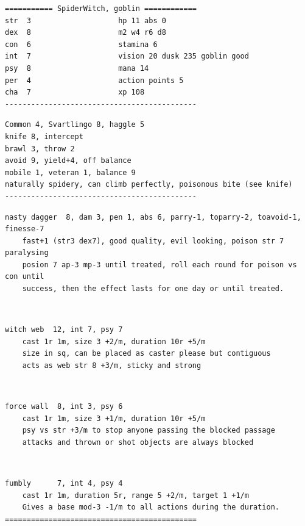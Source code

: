 \small \begin{samepage} \begin{verbatim}
=========== SpiderWitch, goblin ============
str  3                    hp 11 abs 0
dex  8                    m2 w4 r6 d8
con  6                    stamina 6
int  7                    vision 20 dusk 235 goblin good
psy  8                    mana 14
per  4                    action points 5
cha  7                    xp 108
--------------------------------------------
\end{verbatim} \goodbreak \begin{verbatim}
Common 4, Svartlingo 8, haggle 5
knife 8, intercept
brawl 3, throw 2
avoid 9, yield+4, off balance
mobile 1, veteran 1, balance 9
naturally spidery, can climb perfectly, poisonous bite (see knife)
--------------------------------------------
\end{verbatim} \goodbreak \begin{verbatim}
nasty dagger  8, dam 3, pen 1, abs 6, parry-1, toparry-2, toavoid-1, finesse-7
    fast+1 (str3 dex7), good quality, evil looking, poison str 7 paralysing
    posion 7 ap-3 mp-3 until treated, roll each round for poison vs con until
    success, then the effect lasts for one day or until treated.
\end{verbatim} \end{samepage}   \   \goodbreak \begin{samepage} \begin{verbatim}
witch web  12, int 7, psy 7
    cast 1r 1m, size 3 +2/m, duration 10r +5/m
    size in sq, can be placed as caster please but contiguous
    acts as web str 8 +3/m, sticky and strong
\end{verbatim} \end{samepage}   \   \goodbreak \begin{samepage} \begin{verbatim}
force wall  8, int 3, psy 6
    cast 1r 1m, size 3 +1/m, duration 10r +5/m
    psy vs str +3/m to stop anyone passing the blocked passage
    attacks and thrown or shot objects are always blocked
\end{verbatim} \end{samepage}   \   \goodbreak \begin{samepage} \begin{verbatim}
fumbly      7, int 4, psy 4
    cast 1r 1m, duration 5r, range 5 +2/m, target 1 +1/m
    Gives a base mod-3 -1/m to all actions during the duration.
============================================
\end{verbatim} \end{samepage} \normalsize

